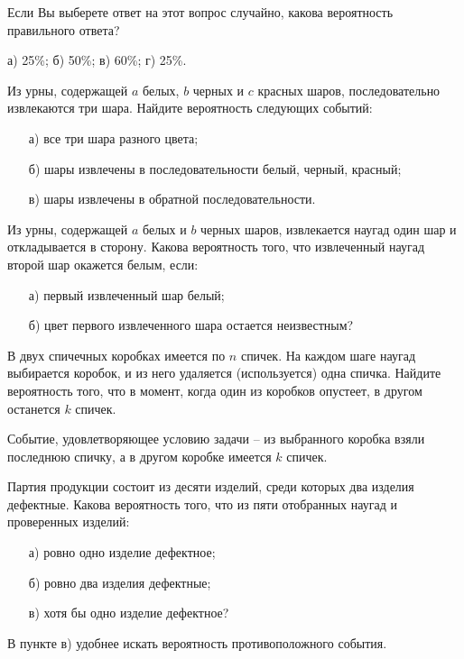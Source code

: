 \begin{problem} 
Если Вы выберете ответ на этот вопрос случайно, какова вероятность правильного ответа?

а) 25{\%}; б) 50{\%}; в) 60{\%}; г) 25{\%}.
\end{problem}

\begin{problem}
Из урны, содержащей $a$ белых, $b$ черных и $c$ красных шаров, последовательно извлекаются три шара. Найдите 
вероятность следующих событий: 
\begin{enumerate}
\item[а)] все три шара разного цвета; 
\item[б)] шары извлечены в последовательности белый, черный, красный; 
\item[в)] шары извлечены в обратной последовательности. 
\end{enumerate}
\end{problem}



\begin{problem}
Из урны, содержащей $a$ белых и $b$ черных шаров, извлекается наугад один шар и откладывается в сторону. Какова вероятность 
того, что извлеченный наугад второй шар окажется белым, если: 
\begin{enumerate}
\item[а)] первый извлеченный шар белый; 
\item[б)] цвет  первого извлеченного шара остается неизвестным? 
\end{enumerate}
\end{problem}


\begin{problem}
В двух спичечных коробках имеется по $n$ спичек. На каждом шаге наугад выбирается коробок, и из него удаляется (используется) 
одна спичка. Найдите вероятность того, что в момент, когда один из коробков опустеет, в другом останется $k$ спичек. 
\end{problem}

\begin{ordre}
Событие, удовлетворяющее условию задачи -- из выбранного коробка взяли последнюю спичку, а в другом коробке имеется $k$ спичек. 
\end{ordre}

\begin{problem}
Партия продукции состоит из десяти изделий, среди которых два изделия дефектные. Какова вероятность того, что из пяти отобранных 
наугад и проверенных изделий: 
\begin{enumerate}
\item[а)] ровно одно изделие дефектное; 
\item[б)] ровно два изделия дефектные; 
\item[в)] хотя бы одно изделие дефектное? 
\end{enumerate} 

\begin{ordre}
В пункте в) удобнее искать вероятность противоположного события.
\end{ordre}

\end{problem}

